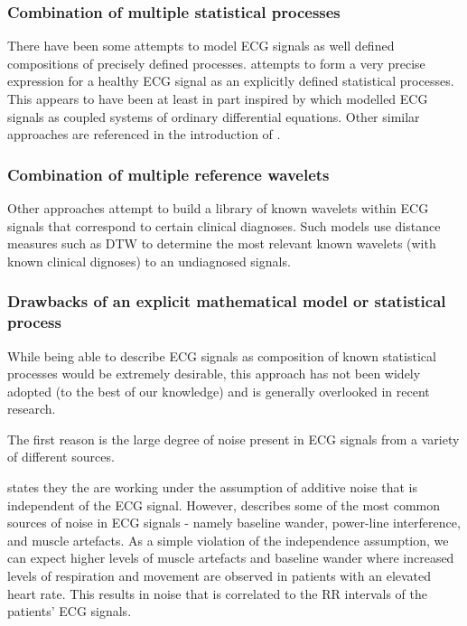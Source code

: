 \documentclass[9pt,conference]{IEEEtran}
\begin{document}
\subsubsection{Combination of multiple statistical processes}
There have been some attempts to model ECG signals as well defined compositions of precisely defined processes. \cite{Napolitano2022Jan} attempts to form a very precise expression for a healthy ECG signal as an explicitly defined statistical processes. This appears to have been at least in part inspired by \cite{coupledECG} which modelled ECG signals as coupled systems of ordinary differential equations. Other similar approaches are referenced in the introduction of \cite{Napolitano2022Jan}.

\subsubsection{Combination of multiple reference wavelets}
Other approaches \cite{shapeMatch2007} attempt to build a library of known wavelets within ECG signals that correspond to certain clinical diagnoses. Such models use distance measures such as DTW to determine the most relevant known wavelets (with known clinical dignoses) to an undiagnosed signals. 

\subsubsection{Drawbacks of an explicit mathematical model or statistical process}
While being able to describe ECG signals as composition of known statistical processes would be extremely desirable, this approach has not been widely adopted (to the best of our knowledge) and is generally overlooked in recent research. 

The first reason is the large degree of noise present in ECG signals from a variety of different sources.

 \cite{Napolitano2022Jan} states they the are working under the assumption of additive noise that is independent of the ECG signal. However, \cite{ecgNoiseReview} describes some of the most common sources of noise in ECG signals - namely baseline wander, power-line interference, and muscle artefacts. As a simple violation of the independence assumption, we can expect higher levels of muscle artefacts and baseline wander where increased levels of respiration and movement are observed in patients with an elevated heart rate. This results in noise that is correlated to the RR intervals of the patients' ECG signals. 
\end{document}
